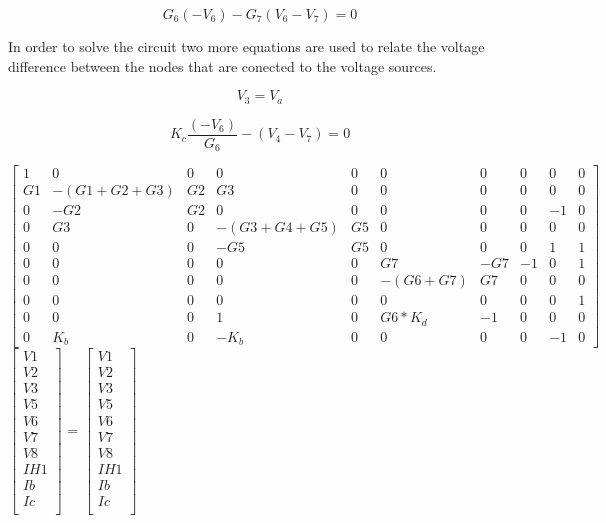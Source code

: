 \begin{equation}
	G_6(-V_6)-G_7(V_6-V_7)=0
	\label{}
\end{equation}

In order to solve the circuit two more equations are used to relate the voltage difference between the nodes that 
are conected to the voltage sources.

\begin{equation}
	V_3 = V_a
	\label{}
\end{equation}

\begin{equation}
	K_c\frac{(-V_6)}{G_6}-(V_4-V_7)=0
	\label{}
\end{equation}

{\footnotesize

$ \begin{bmatrix}
1 & 0 & 0 & 0 & 0 & 0 & 0 & 0 & 0 & 0 \\
G1 & -(G1+G2+G3) & G2 & G3 & 0 & 0 & 0 & 0 & 0 & 0 \\
0 & -G2 & G2 & 0 & 0 & 0 & 0 & 0 & -1 & 0 \\
0 & G3 & 0 & -(G3+G4+G5) & G5 & 0 & 0 & 0 & 0 & 0 \\
0 & 0 & 0 & -G5 & G5 & 0 & 0 & 0 & 1 & 1 \\
0 & 0 & 0 & 0 & 0 & G7 & -G7 & -1 & 0 & 1 \\
0 & 0 & 0 & 0 & 0 & -(G6+G7) & G7 & 0 & 0 & 0 \\
0 & 0 & 0 & 0 & 0 & 0 & 0 & 0 & 0 & 1 \\
0 & 0 & 0 & 1 & 0 & G6*K_d & -1 & 0 & 0 & 0 \\
0 & K_b & 0 & -K_b & 0 & 0 & 0 & 0 & -1 & 0 
\end{bmatrix}  $
$ \begin{bmatrix}
V1 \\
V2 \\
V3 \\
V5 \\
V6 \\
V7 \\
V8 \\
IH1 \\
Ib \\
Ic \\
\end{bmatrix}  $
=
$ \begin{bmatrix}
V1 \\
V2 \\
V3 \\
V5 \\
V6 \\
V7 \\
V8 \\
IH1 \\
Ib \\
Ic \\
\end{bmatrix}  $


}
